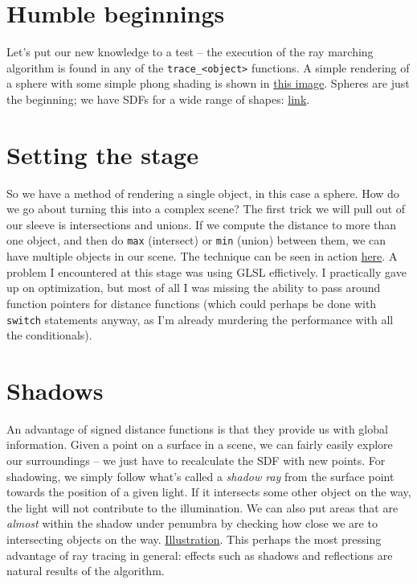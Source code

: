 \documentclass[abstract=off,oneside]{scrreprt}
\begin{document}
\section*{Humble beginnings}
\label{sec-4}
\label{sec:beginnings}
Let's put our new knowledge to a test -- the execution of the ray
marching algorithm is found in any of the \verb~trace_<object>~
functions. A simple rendering of a sphere with some simple phong
shading is shown in \hyperref[fig:simplesphere]{this image}. Spheres are just the beginning; we
have SDFs for a wide range of shapes: \href{https://iquilezles.org/www/articles/distfunctions/distfunctions.htm}{link}.

\section*{Setting the stage}
\label{sec-5}
\label{sec:creatingascene}
So we have a method of rendering a single object, in this case a
sphere. How do we go about turning this into a complex scene? The
first trick we will pull out of our sleeve is intersections and
unions. If we compute the distance to more than one object, and then
do \verb~max~ (intersect) or \verb~min~ (union) between them, we can have
multiple objects in our scene. The technique can be seen in action
\hyperref[fig:union]{here}. A problem I encountered at this stage was using GLSL
effictively. I practically gave up on optimization, but most of all I
was missing the ability to pass around function pointers for distance
functions (which could perhaps be done with \verb~switch~ statements
anyway, as I'm already murdering the performance with all the
conditionals).

\section*{Shadows}
\label{sec-6}
\label{sec:shadows} An advantage of signed distance functions is that they
provide us with global information. Given a point on a surface in a
scene, we can fairly easily explore our surroundings -- we just have
to recalculate the SDF with new points. For shadowing, we simply
follow what's called a \emph{shadow ray} from the surface point towards the
position of a given light. If it intersects some other object on the
way, the light will not contribute to the illumination. We can also
put areas that are \emph{almost} within the shadow under penumbra by
checking how close we are to intersecting objects on the
way. \hyperref[fig:penumbra]{Illustration}. This perhaps the most pressing advantage of ray
tracing in general: effects such as shadows and reflections are
natural results of the algorithm.
\end{document}
